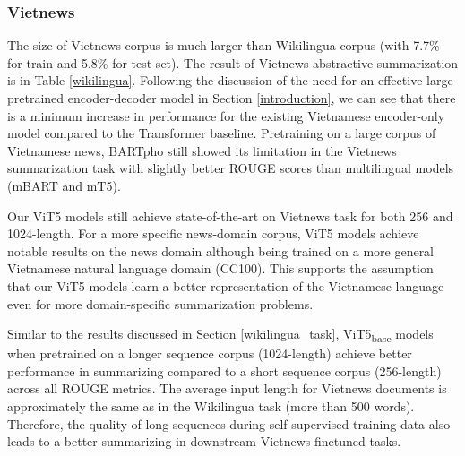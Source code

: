 \documentclass[11pt,a4paper]{article}
\begin{document}
\subsubsection{Vietnews}
The size of Vietnews corpus is much larger than Wikilingua corpus (with 7.7\% for train and 5.8\% for test set). 
 The result of Vietnews abstractive summarization is in Table \ref{wikilingua}. Following the discussion of the need for an effective large pretrained encoder-decoder model in Section \ref{introduction}, we can see that there is a minimum increase in performance for the existing Vietnamese encoder-only model compared to the Transformer baseline. Pretraining on a large corpus of Vietnamese news, BARTpho still showed its limitation in the Vietnews summarization task with slightly better ROUGE scores than multilingual models (mBART and mT5).
 
 Our ViT5 models still achieve state-of-the-art on Vietnews task for both 256 and 1024-length. For a more specific news-domain corpus, ViT5 models achieve notable results on the news domain although being trained on a more general Vietnamese natural language domain (CC100). This supports the assumption that our ViT5 models learn a better representation of the Vietnamese language even for more domain-specific summarization problems. 
 
 Similar to the results discussed in Section \ref{wikilingua_task}, ViT5\textsubscript{base} models when pretrained on a longer sequence corpus (1024-length) achieve better performance in summarizing compared to a short sequence corpus (256-length) across all ROUGE metrics.
 The average input length for Vietnews documents is approximately the same as in the Wikilingua task (more than 500 words). Therefore, the quality of long sequences during self-supervised training data also leads to a better summarizing in downstream Vietnews finetuned tasks.

 
 



 
 
 
 \label{vietnews}
 

 
  
\end{document}
